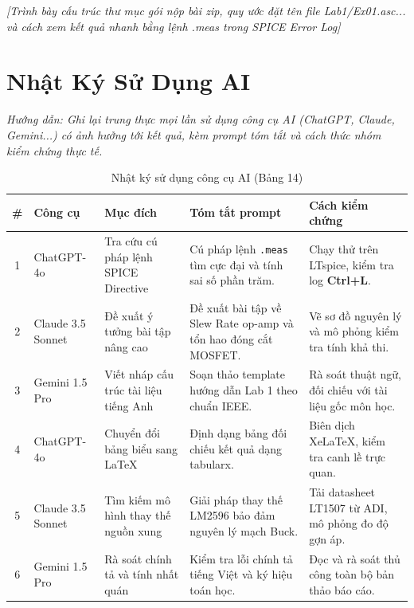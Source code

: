 \documentclass[12pt,a4paper]{report}
\begin{document}
\begin{orangebox}
\textit{\color{guidegray}[Trình bày cấu trúc thư mục gói nộp bài zip, quy ước đặt tên file Lab1/Ex01.asc... và cách xem kết quả nhanh bằng lệnh .meas trong SPICE Error Log]}
\end{orangebox}

\chapter{Nhật Ký Sử Dụng AI}

\textit{\color{guidegray}
Hướng dẫn: Ghi lại trung thực mọi lần sử dụng công cụ AI (ChatGPT, Claude, Gemini...) có ảnh hưởng tới kết quả, kèm prompt tóm tắt và cách thức nhóm kiểm chứng thực tế.
}

\begin{table}[H]
\centering
\caption{Nhật ký sử dụng công cụ AI (Bảng 14)}
\label{tab:bang14_ailog}
\renewcommand{\arraystretch}{1.3}
\small
\begin{tabularx}{\textwidth}{|c|p{2.2cm}|p{3.2cm}|X|p{3.8cm}|}
\hline
\rowcolor{codebg}
\textbf{\#} & \textbf{Công cụ} & \textbf{Mục đích} & \textbf{Tóm tắt prompt} & \textbf{Cách kiểm chứng} \\ \hline
1 & ChatGPT-4o & Tra cứu cú pháp lệnh SPICE Directive & Cú pháp lệnh \lstinline|.meas| tìm cực đại và tính sai số phần trăm. & Chạy thử trên LTspice, kiểm tra log \textbf{Ctrl+L}. \\ \hline
2 & Claude 3.5 Sonnet & Đề xuất ý tưởng bài tập nâng cao & Đề xuất bài tập về Slew Rate op-amp và tổn hao đóng cắt MOSFET. & Vẽ sơ đồ nguyên lý và mô phỏng kiểm tra tính khả thi. \\ \hline
3 & Gemini 1.5 Pro & Viết nháp cấu trúc tài liệu tiếng Anh & Soạn thảo template hướng dẫn Lab 1 theo chuẩn IEEE. & Rà soát thuật ngữ, đối chiếu với tài liệu gốc môn học. \\ \hline
4 & ChatGPT-4o & Chuyển đổi bảng biểu sang LaTeX & Định dạng bảng đối chiếu kết quả dạng tabularx. & Biên dịch XeLaTeX, kiểm tra canh lề trực quan. \\ \hline
5 & Claude 3.5 Sonnet & Tìm kiếm mô hình thay thế nguồn xung & Giải pháp thay thế LM2596 bảo đảm nguyên lý mạch Buck. & Tải datasheet LT1507 từ ADI, mô phỏng đo độ gợn áp. \\ \hline
6 & Gemini 1.5 Pro & Rà soát chính tả và tính nhất quán & Kiểm tra lỗi chính tả tiếng Việt và ký hiệu toán học. & Đọc và rà soát thủ công toàn bộ bản thảo báo cáo. \\ \hline
\end{tabularx}
\end{table}
\end{document}
